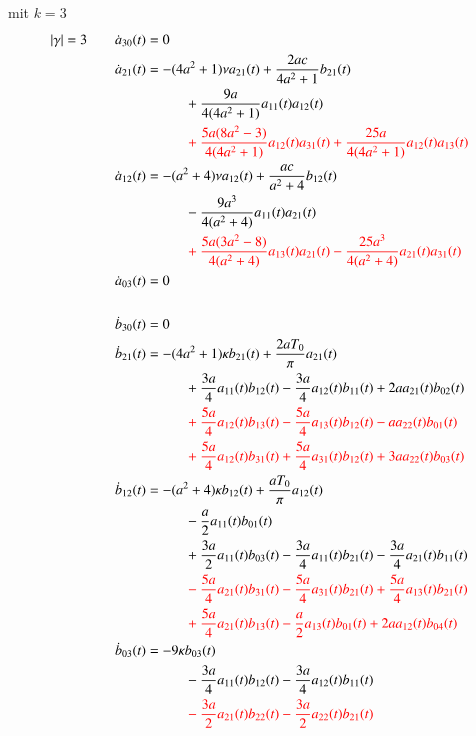 mit $k = 3$
\begin{align*}
|\gamma| = 3
\qquad &
\dot{a}_{30}(t) = 0
\\
&
\dot{a}_{21}(t)
=
-
(4 a^2+1)
\nu
a_{21}(t)
+
\frac{2 a c}{4 a^2+1} b_{21}(t)
\\
&\phantom{aaaaaaaaaa}
+
\frac{9 a}{4 (4 a^2+1)} a_{11}(t) a_{12}(t)
\\
&\phantom{aaaaaaaaaa}
\color{red}
+
\frac{5 a (8 a^2 - 3)}{4 (4 a^2+1)} a_{12}(t) a_{31}(t)
+
\frac{25 a}{4 (4 a^2+1)} a_{12}(t) a_{13}(t)
\\
&
\dot{a}_{12}(t)
=
-
(a^2+4)
\nu
a_{12}(t)
+
\frac{a c}{a^2+4} b_{12}(t)
\\
&\phantom{aaaaaaaaaa}
-
\frac{9 a^3}{4 (a^2+4)} a_{11}(t) a_{21}(t)
\\
&\phantom{aaaaaaaaaa}
\color{red}
+
\frac{5 a (3 a^2 - 8)}{4 (a^2+4)} a_{13}(t) a_{21}(t)
-
\frac{25 a^3}{4 (a^2+4)} a_{21}(t) a_{31}(t)
\\
&
\dot{a}_{03}(t) = 0
\\
\\
&
\dot{b}_{30}(t) = 0
\\
&
\dot{b}_{21}(t)
=
-
(4 a^2+1)
\kappa
b_{21}(t)
+
\frac{2 a T_{0}}{\pi} a_{21}(t)
\\
&\phantom{aaaaaaaaaa}
+
\frac{3 a}{4} a_{11}(t) b_{12}(t)
-
\frac{3 a}{4} a_{12}(t) b_{11}(t)
+
2 a
a_{21}(t) b_{02}(t)
\\
&\phantom{aaaaaaaaaa}
\color{red}
+
\frac{5 a}{4} a_{12}(t) b_{13}(t)
-
\frac{5 a}{4} a_{13}(t) b_{12}(t)
-
a
a_{22}(t) b_{01}(t)
\\
&\phantom{aaaaaaaaaa}
\color{red}
+
\frac{5 a}{4} a_{12}(t) b_{31}(t)
+
\frac{5 a}{4} a_{31}(t) b_{12}(t)
+
3 a
a_{22}(t) b_{03}(t)
\\
&
\dot{b}_{12}(t)
=
-
(a^2+4)
\kappa
b_{12}(t)
+
\frac{a T_{0}}{\pi} a_{12}(t)
\\
&\phantom{aaaaaaaaaa}
-
\frac{a}{2} a_{11}(t) b_{01}(t)
\\
&\phantom{aaaaaaaaaa}
+
\frac{3 a}{2} a_{11}(t) b_{03}(t)
-
\frac{3 a}{4} a_{11}(t) b_{21}(t)
-
\frac{3 a}{4} a_{21}(t) b_{11}(t)
\\
&\phantom{aaaaaaaaaa}
\color{red}
-
\frac{5 a}{4} a_{21}(t) b_{31}(t)
-
\frac{5 a}{4} a_{31}(t) b_{21}(t)
+
\frac{5 a}{4} a_{13}(t) b_{21}(t)
\\
&\phantom{aaaaaaaaaa}
\color{red}
+
\frac{5 a}{4} a_{21}(t) b_{13}(t)
-
\frac{a}{2} a_{13}(t) b_{01}(t)
+
2 a
a_{12}(t) b_{04}(t)
\\
&
\dot{b}_{03}(t)
=
-
9
\kappa
b_{03}(t)
\\
&\phantom{aaaaaaaaaa}
-
\frac{3 a}{4} a_{11}(t) b_{12}(t)
-
\frac{3 a}{4} a_{12}(t) b_{11}(t)
\\
&\phantom{aaaaaaaaaa}
\color{red}
-
\frac{3 a}{2} a_{21}(t) b_{22}(t)
-
\frac{3 a}{2} a_{22}(t) b_{21}(t)
\end{align*}
